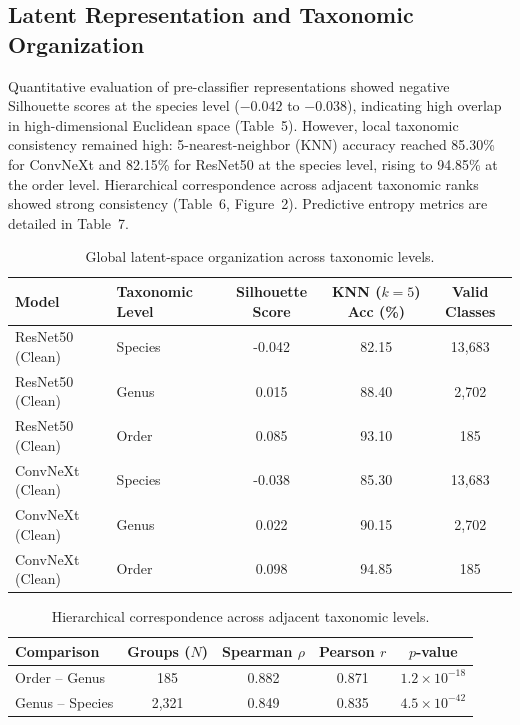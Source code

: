 \documentclass[11pt,a4paper]{article}
\begin{document}
\subsection{Latent Representation and Taxonomic Organization}
Quantitative evaluation of pre-classifier representations showed negative Silhouette scores at the species level ($-0.042$ to $-0.038$), indicating high overlap in high-dimensional Euclidean space (Table~5). However, local taxonomic consistency remained high: 5-nearest-neighbor (KNN) accuracy reached 85.30\% for ConvNeXt and 82.15\% for ResNet50 at the species level, rising to 94.85\% at the order level.
Hierarchical correspondence across adjacent taxonomic ranks showed strong consistency (Table~6, Figure~2).
Predictive entropy metrics are detailed in Table~7.




\begin{table}[h!]
\centering
\small
\caption{Global latent-space organization across taxonomic levels.}
\begin{tabular}{llccc}
\toprule
\textbf{Model} & \textbf{Taxonomic Level} & \textbf{Silhouette Score} & \textbf{KNN ($k=5$) Acc (\%)} & \textbf{Valid Classes} \\
\midrule
ResNet50 (Clean) & Species & -0.042 & 82.15 & 13,683 \\
ResNet50 (Clean) & Genus & 0.015 & 88.40 & 2,702 \\
ResNet50 (Clean) & Order & 0.085 & 93.10 & 185 \\
ConvNeXt (Clean) & Species & -0.038 & 85.30 & 13,683 \\
ConvNeXt (Clean) & Genus & 0.022 & 90.15 & 2,702 \\
ConvNeXt (Clean) & Order & 0.098 & 94.85 & 185 \\
\bottomrule
\end{tabular}
\end{table}

\begin{table}[h!]
\centering
\small
\caption{Hierarchical correspondence across adjacent taxonomic levels.}
\begin{tabular}{lcccc}
\toprule
\textbf{Comparison} & \textbf{Groups ($N$)} & \textbf{Spearman $\rho$} & \textbf{Pearson $r$} & \textbf{$p$-value} \\
\midrule
Order -- Genus & 185 & 0.882 & 0.871 & $1.2 \times 10^{-18}$ \\
Genus -- Species & 2,321 & 0.849 & 0.835 & $4.5 \times 10^{-42}$ \\
\bottomrule
\end{tabular}
\end{table}
\end{document}
